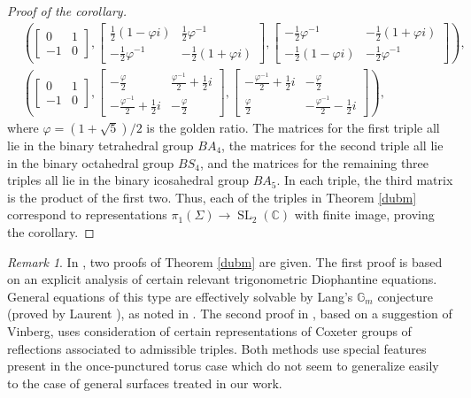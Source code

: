 \documentclass[reqno]{amsart}
\theoremstyle{plain}
\theoremstyle{definition}
\theoremstyle{remark}
\newtheorem*{remark}{Remark}
\newcommand{\C}{{\mathbb{C}}}
\newcommand{\G}{{\mathbb{G}}}
\DeclareMathOperator{\SL}{SL}
\begin{document}
\begin{proof}[Proof of the corollary]
\begin{align*}
&\left(\begin{bmatrix}0 & 1\\ -1 & 0\end{bmatrix},\begin{bmatrix}\frac{1}{2}(1-\varphi i) & \frac{1}{2}\varphi^{-1}\\ -\frac{1}{2}\varphi^{-1} & -\frac{1}{2}(1+\varphi i)\end{bmatrix},\begin{bmatrix}-\frac{1}{2}\varphi^{-1} & -\frac{1}{2}(1+\varphi i)\\ -\frac{1}{2}(1-\varphi i) & -\frac{1}{2}\varphi^{-1}\end{bmatrix}\right),\\
&\left(\begin{bmatrix}0 & 1\\ -1 & 0\end{bmatrix},\begin{bmatrix}-\frac{\varphi}{2} &\frac{\varphi^{-1}}{2}+\frac{1}{2}i\\-\frac{\varphi^{-1}}{2}+\frac{1}{2}i & -\frac{\varphi}{2}\end{bmatrix},\begin{bmatrix}-\frac{\varphi^{-1}}{2}+\frac{1}{2}i & -\frac{\varphi}{2}\\\frac{\varphi}{2} &-\frac{\varphi^{-1}}{2}-\frac{1}{2}i\end{bmatrix}\right),
\end{align*}
where $\varphi=(1+\sqrt 5)/2$ is the golden ratio. The matrices for the first triple all lie in the binary tetrahedral group $BA_4$, the matrices for the second triple all lie in the binary octahedral group $BS_4$, and the matrices for the remaining three triples all lie in the binary icosahedral group $BA_5$. In each triple, the third matrix is the product of the first two. Thus, each of the triples in Theorem \ref{dubm} correspond to representations $\pi_1(\Sigma)\to\SL_2(\C)$ with finite image, proving the corollary.
\end{proof}

\begin{remark}
In \cite{dm}, two proofs of Theorem \ref{dubm} are given. The first proof is based on an explicit analysis of certain relevant trigonometric Diophantine equations. General equations of this type are effectively solvable by Lang's $\G_m$ conjecture (proved by Laurent \cite{laurent}), as noted in \cite{bgs}. The second proof in \cite{dm}, based on a suggestion of Vinberg, uses consideration of certain representations of Coxeter groups of reflections associated to admissible triples. Both methods use special features present in the once-punctured torus case which do not seem to generalize easily to the case of general surfaces treated in our work.
\end{remark}
\end{document}
